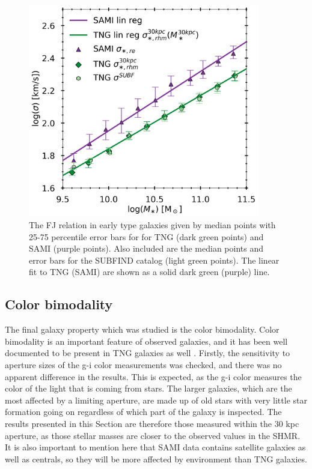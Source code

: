 \begin{figure}
    \centering
    \includegraphics[width=0.9\textwidth]{images/FJ.png}
    \caption{The FJ relation in early type galaxies given by median points with 25-75 percentile error bars for for TNG (dark green points) and SAMI (purple points). Also included are the median points and error bars for the SUBFIND catalog (light green points). The linear fit to TNG (SAMI) are shown as a solid dark green (purple) line.}
    \label{FJ}
\end{figure}



\subsection{Color bimodality}
The final galaxy property which was studied is the color bimodality. Color bimodality is an important feature of observed galaxies, and it has been well documented to be present in TNG galaxies as well \parencite{Nelson2017}. Firstly, the sensitivity to aperture sizes of the g-i color measurements was checked, and there was no apparent difference in the results. This is expected, as the g-i color measures the color of the light that is coming from stars. The larger galaxies, which are the most affected by a limiting aperture, are made up of old stars with very little star formation going on regardless of which part of the galaxy is inspected. The results presented in this Section are therefore those measured within the 30 kpc aperture, as those stellar masses are closer to the observed values in the SHMR. It is also important to mention here that SAMI data contains satellite galaxies as well as centrals, so they will be more affected by environment than TNG galaxies.

